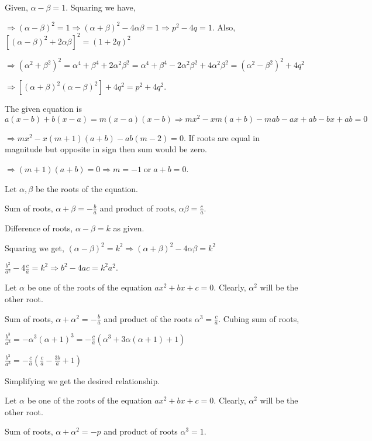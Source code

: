  Given, $\alpha - \beta = 1$. Squaring we have,

  $\Rightarrow (\alpha - \beta)^2 = 1 \Rightarrow (\alpha + \beta)^2 - 4\alpha\beta = 1\Rightarrow p^2 - 4q = 1$. Also,
  $[(\alpha - \beta)^2 + 2\alpha\beta]^2 = (1 + 2q)^2$

  $\Rightarrow (\alpha^2 + \beta^2)^2 = \alpha^4 + \beta^4 + 2\alpha^2\beta^2= \alpha^4 + \beta^4 - 2\alpha^2\beta^2 +
  4\alpha^2\beta^2 = (\alpha^2 - \beta^2)^2 + 4q^2$

  $\Rightarrow [(\alpha + \beta)^2(\alpha - \beta)^2] + 4q^2 = p^2 + 4q^2$.
\item The given equation is $a(x - b) + b(x - a) = m(x - a)(x - b)\Rightarrow mx^2 - xm(a + b) - mab - ax +
  ab - bx + ab = 0$

  $\Rightarrow mx^2 - x(m + 1)(a + b) - ab(m - 2) = 0$. If roots are equal in magnitude but opposite in sign
  then sum would be zero.

  $\Rightarrow (m + 1)(a + b) = 0 \Rightarrow m = -1\;\text{or}\;a + b = 0$.
\item Let $\alpha, \beta$ be the roots of the equation.

  Sum of roots, $\alpha + \beta = -\frac{b}{a}$ and product of roots, $\alpha\beta = \frac{c}{a}$.

  Difference of roots, $\alpha - \beta = k$ as given.

  Squaring we get, $(\alpha - \beta)^2 = k^2 \Rightarrow (\alpha + \beta)^2 - 4\alpha\beta = k^2$

  $\frac{b^2}{a^2} - 4\frac{c}{a} = k^2 \Rightarrow b^2 - 4ac = k^2a^2$.
\item Let $\alpha$ be one of the roots of the equation $ax^2 + bx + c = 0$. Clearly, $\alpha^2$ will be the other root.

  Sum of roots, $\alpha + \alpha^2 = -\frac{b}{a}$ and product of the roots $\alpha^3 = \frac{c}{a}$. Cubing sum of roots,

  $\frac{b^3}{a^3} = -\alpha^3(\alpha + 1)^3 = -\frac{c}{a}(\alpha^3 + 3\alpha(\alpha + 1) + 1)$

  $\frac{b^3}{a^3} = -\frac{c}{a}\left(\frac{c}{a} - \frac{3b}{a} + 1\right)$

  Simplifying we get the desired relationship.
\item Let $\alpha$ be one of the roots of the equation $ax^2 + bx + c = 0$. Clearly, $\alpha^2$ will be the other root.

  Sum of roots, $\alpha + \alpha^2 = -p$ and product of roots $\alpha^3 = 1$.

